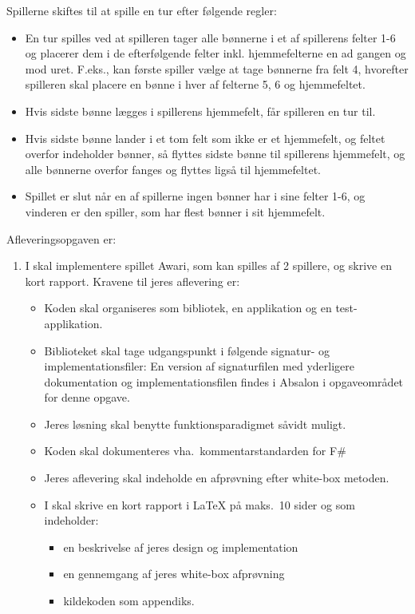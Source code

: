 \documentclass[a4paper,12pt]{article}
\begin{document}
Spillerne skiftes til at spille en tur efter følgende regler:
\begin{itemize}
\item En tur spilles ved at spilleren tager alle bønnerne i et af
  spillerens felter 1-6 og placerer dem i de efterfølgende felter
  inkl. hjemmefelterne en ad gangen og mod uret. F.eks., kan første
  spiller vælge at tage bønnerne fra felt 4, hvorefter spilleren skal
  placere en bønne i hver af felterne 5, 6 og hjemmefeltet.
\item Hvis sidste bønne lægges i spillerens hjemmefelt, får spilleren
  en tur til.
\item Hvis sidste bønne lander i et tom felt som ikke er et hjemmefelt, og
  feltet overfor indeholder bønner, så flyttes sidste bønne til
  spillerens hjemmefelt, og alle bønnerne overfor fanges og flyttes ligså til
  hjemmefeltet.
\item Spillet er slut når en af spillerne ingen bønner har i sine
  felter 1-6, og vinderen er den spiller, som har flest bønner i sit
  hjemmefelt.
\end{itemize}
Afleveringsopgaven er:
\begin{enumerate}[label=7g.\arabic*,start=0]
\item I skal implementere spillet Awari, som kan spilles af 2
  spillere, og skrive en kort rapport. Kravene til jeres aflevering
  er:
  \begin{itemize}
  \item Koden skal organiseres som bibliotek, en applikation og en
    test-applikation.
  \item Biblioteket skal tage udgangspunkt i følgende signatur- og
    implementationsfiler:
     En version af signaturfilen
    med yderligere dokumentation og implementationsfilen findes i
    Absalon i opgaveområdet for denne opgave.
  \item Jeres løsning skal benytte funktionsparadigmet såvidt muligt.
  \item Koden skal dokumenteres vha.\ kommentarstandarden for F\#
  \item Jeres aflevering skal indeholde en afprøvning efter white-box metoden.
  \item I skal skrive en kort rapport i LaTeX  på maks.\ 10 sider og
    som indeholder:
    \begin{itemize}
    \item en beskrivelse af jeres design og implementation
    \item en gennemgang af jeres white-box afprøvning
    \item kildekoden som appendiks.
    \end{itemize}
  \end{itemize}
\end{enumerate}
\end{document}
